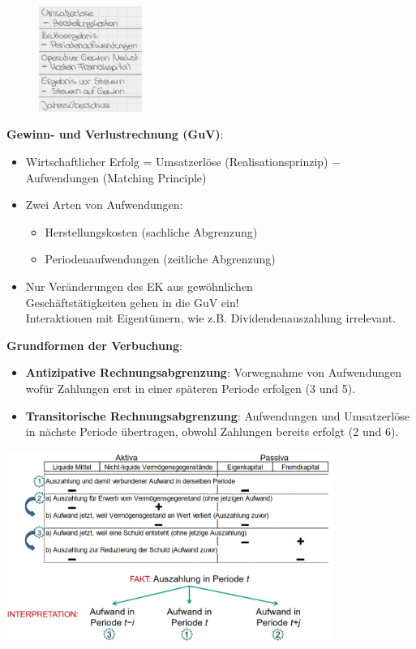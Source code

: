\begin{figure}
	\includegraphics[width=0.3\textwidth]{images/guv-ex.png}
	\vspace{-100pt}
\end{figure} 

\textbf{Gewinn- und Verlustrechnung (GuV)}:
\begin{itemize}
	\item Wirtschaftlicher Erfolg = Umsatzerlöse (Realisationsprinzip) $-$ Aufwendungen (Matching Principle)
	\item Zwei Arten von Aufwendungen:
	\begin{itemize}
		\item Herstellungskosten (sachliche Abgrenzung)
		\item Periodenaufwendungen (zeitliche Abgrenzung)
	\end{itemize}
	\item Nur Veränderungen des EK aus gewöhnlichen\\ Geschäftstätigkeiten gehen in die GuV ein!\\
	Interaktionen mit Eigentümern, wie z.B. Dividendenauszahlung irrelevant.
\end{itemize}
\bigskip
\textbf{Grundformen der Verbuchung}:
\begin{itemize}
	\item \textbf{Antizipative Rechnungsabgrenzung}: Vorwegnahme von Aufwendungen wofür Zahlungen erst in einer späteren Periode erfolgen (3 und 5).
	\item \textbf{Transitorische Rechnungsabgrenzung}: Aufwendungen und Umsatzerlöse in nächste Periode übertragen, obwohl Zahlungen bereits erfolgt (2 und 6).
\end{itemize}
\begin{center}
	\includegraphics[width=0.8\textwidth]{images/gf1.png}
\end{center}
